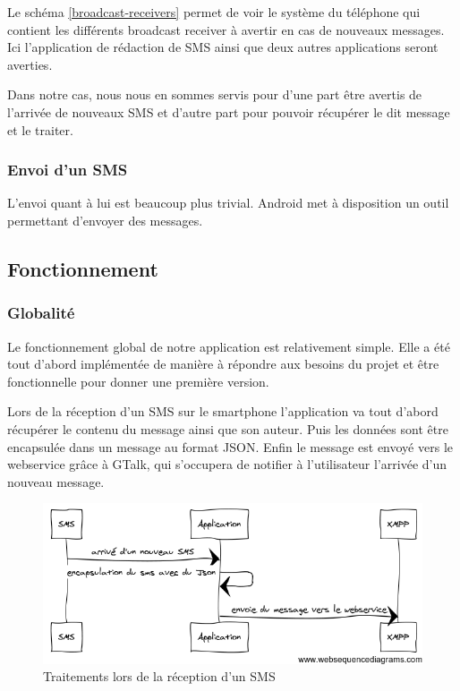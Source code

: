 Le schéma \ref{broadcast-receivers} permet de voir le système du téléphone qui contient les différents broadcast receiver à avertir en cas de nouveaux messages. Ici l'application de rédaction de SMS ainsi que deux autres 
applications seront averties.

Dans notre cas, nous nous en sommes servis pour d'une part être avertis de l'arrivée de nouveaux SMS et d'autre part pour pouvoir récupérer le dit message et le traiter.


\subsubsection{Envoi d'un SMS}

L'envoi quant à lui est beaucoup plus trivial. Android met à disposition un outil permettant d'envoyer
des messages.





\subsection{Fonctionnement}


\subsubsection{Globalité}

Le fonctionnement global de notre application est relativement simple.
Elle a été tout d'abord implémentée de manière à répondre aux besoins du projet et être fonctionnelle pour donner une première version.

Lors de la réception d'un SMS sur le smartphone l'application va tout d'abord récupérer le contenu du message ainsi que son auteur.
Puis les données sont être encapsulée dans un message au format JSON.
Enfin le message est envoyé vers le webservice grâce à GTalk, qui s'occupera de notifier à l'utilisateur l'arrivée d'un nouveau message.

\begin{figure}[!h]
  \center
  \includegraphics[width=12cm]{img/encapsulation-sms.png}
  \caption{Traitements lors de la réception d'un SMS}
  \label{encapsulation-sms}
\end{figure}

